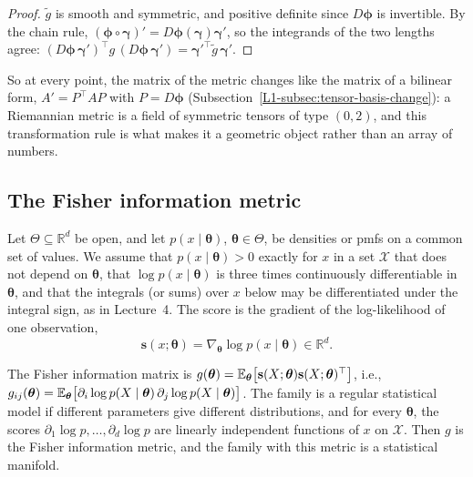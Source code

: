 \begin{proof}
    $\tilde g$ is smooth and symmetric, and positive definite since $D\boldsymbol{\phi}$ is invertible. By the chain rule, $(\boldsymbol{\phi} \circ \boldsymbol{\gamma})' = D\boldsymbol{\phi}(\boldsymbol{\gamma})\boldsymbol{\gamma}'$, so the integrands of the two lengths agree: $(D\boldsymbol{\phi}\,\boldsymbol{\gamma}')^\top g\,(D\boldsymbol{\phi}\,\boldsymbol{\gamma}') = \boldsymbol{\gamma}'^\top\tilde g\,\boldsymbol{\gamma}'$.
\end{proof}

So at every point, the matrix of the metric changes like the matrix of a bilinear form, $A' = P^\top AP$ with $P = D\boldsymbol{\phi}$ (Subsection~\ref{L1-subsec:tensor-basis-change}): a Riemannian metric is a field of symmetric tensors of type $(0, 2)$, and this transformation rule is what makes it a geometric object rather than an array of numbers.

\subsection{The Fisher information metric}

Let $\Theta \subseteq \mathbb{R}^d$ be open, and let $p(x \mid \boldsymbol{\theta})$, $\boldsymbol{\theta} \in \Theta$, be densities or pmfs on a common set of values. We assume that $p(x \mid \boldsymbol{\theta}) > 0$ exactly for $x$ in a set $\mathcal{X}$ that does not depend on $\boldsymbol{\theta}$, that $\log p(x \mid \boldsymbol{\theta})$ is three times continuously differentiable in $\boldsymbol{\theta}$, and that the integrals (or sums) over $x$ below may be differentiated under the integral sign, as in Lecture~4. The score is the gradient of the log-likelihood of one observation,
\[\mathbf{s}(x; \boldsymbol{\theta}) = \nabla_{\boldsymbol{\theta}}\log p(x \mid \boldsymbol{\theta}) \in \mathbb{R}^d.\]

\begin{definition}\label{A-def:fisher-metric}
    The Fisher information matrix is $g(\boldsymbol{\theta}) = \mathbb{E}_{\boldsymbol{\theta}}\big[\mathbf{s}(X; \boldsymbol{\theta})\mathbf{s}(X; \boldsymbol{\theta})^\top\big]$, i.e., $g_{ij}(\boldsymbol{\theta}) = \mathbb{E}_{\boldsymbol{\theta}}\big[\partial_i\log p(X \mid \boldsymbol{\theta})\,\partial_j\log p(X \mid \boldsymbol{\theta})\big]$. The family is a regular statistical model if different parameters give different distributions, and for every $\boldsymbol{\theta}$, the scores $\partial_1\log p, \ldots, \partial_d\log p$ are linearly independent functions of $x$ on $\mathcal{X}$. Then $g$ is the Fisher information metric, and the family with this metric is a statistical manifold.
\end{definition}

